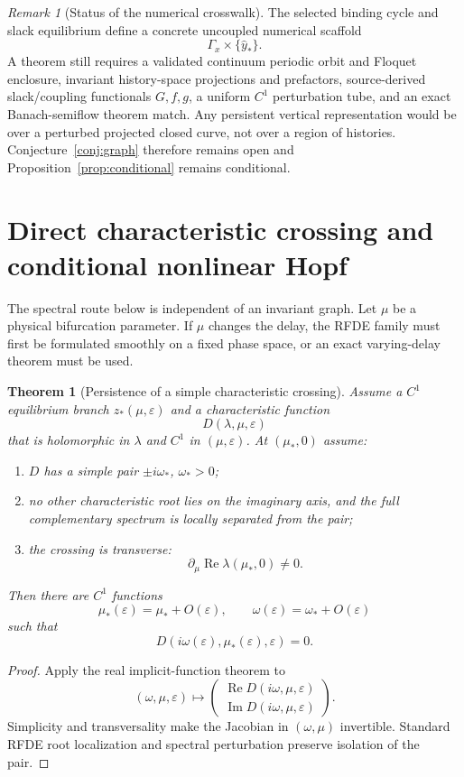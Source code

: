 \documentclass[11pt]{article}
\newtheorem{theorem}{Theorem}
\theoremstyle{definition}
\theoremstyle{remark}
\newtheorem{remark}{Remark}
\begin{document}
\begin{remark}[Status of the numerical crosswalk]
The selected binding cycle and slack equilibrium define a concrete uncoupled numerical scaffold
\[
\Gamma_x\times\{\widehat y_*\}.
\]
A theorem still requires a validated continuum periodic orbit and Floquet enclosure, invariant history-space projections and prefactors, source-derived slack/coupling functionals $G,f,g$, a uniform $C^1$ perturbation tube, and an exact Banach-semiflow theorem match. Any persistent vertical representation would be over a perturbed projected closed curve, not over a region of histories. Conjecture~\ref{conj:graph} therefore remains open and Proposition~\ref{prop:conditional} remains conditional.
\end{remark}

\section{Direct characteristic crossing and conditional nonlinear Hopf}
\label{sec:hopf}

The spectral route below is independent of an invariant graph. Let $\mu$ be a physical bifurcation parameter. If $\mu$ changes the delay, the RFDE family must first be formulated smoothly on a fixed phase space, or an exact varying-delay theorem must be used.

\begin{theorem}[Persistence of a simple characteristic crossing]
\label{thm:crossing}
Assume a $C^1$ equilibrium branch $z_*(\mu,\varepsilon)$ and a characteristic function
\[
D(\lambda,\mu,\varepsilon)
\]
that is holomorphic in $\lambda$ and $C^1$ in $(\mu,\varepsilon)$. At $(\mu_*,0)$ assume:
\begin{enumerate}
\item $D$ has a simple pair $\pm i\omega_*$, $\omega_*>0$;
\item no other characteristic root lies on the imaginary axis, and the full complementary spectrum is locally separated from the pair;
\item the crossing is transverse:
\[
\partial_\mu\operatorname{Re}\lambda(\mu_*,0)\ne0.
\]
\end{enumerate}
Then there are $C^1$ functions
\[
\mu_*(\varepsilon)=\mu_*+O(\varepsilon),
\qquad
\omega(\varepsilon)=\omega_*+O(\varepsilon)
\]
such that
\[
D(i\omega(\varepsilon),\mu_*(\varepsilon),\varepsilon)=0.
\]
\end{theorem}

\begin{proof}
Apply the real implicit-function theorem to
\[
(\omega,\mu,\varepsilon)\longmapsto
\begin{pmatrix}
\operatorname{Re}D(i\omega,
\mu,
\varepsilon)\\
\operatorname{Im}D(i\omega,
\mu,
\varepsilon)
\end{pmatrix}.
\]
Simplicity and transversality make the Jacobian in $(\omega,\mu)$ invertible. Standard RFDE root localization and spectral perturbation preserve isolation of the pair.\qedhere
\end{proof}
\end{document}
